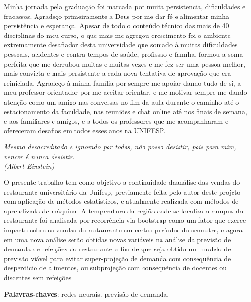 \documentclass[	12pt, Times, openright, twoside, a4paper, english, brazil]{abntex2}
\begin{document}
\begin{agradecimentos}
Minha jornada pela graduação foi marcada por muita persistencia, dificuldades e fracassos. Agradeço primeiramente a Deus por me dar fé e alimentar minha persistência e esperança. Apesar de todo o conteúdo técnico das mais de 40 disciplinas do meu curso, o que mais me agregou crescimento foi o ambiente extremamente desafiador desta universidade que somado à muitas dificuldades pessoais, acidentes e contra-tempos de saúde, profissão e família, formou a soma perfeita que me derrubou muitas e muitas vezes e me fez ser uma pessoa melhor, mais convicta e mais persistente a cada nova tentativa de aprovação que era reiniciada.  Agradeço à minha família por sempre me apoiar dando tudo de si, a meu professor orientador por me aceitar orientar, e me motivar sempre me dando atenção como um amigo nas conversas no fim da aula durante o caminho até o estacionamento da faculdade, nas reuniões e chat online até nos finais de semana, e aos familiares e amigos, e a todos os professores que me acompanharam e ofereceram desafios em todos esses anos na UNIFESP. 

\end{agradecimentos}

\begin{epigrafe}
    \vspace*{\fill}
	\begin{flushright}
		\textit{Mesmo desacreditado e ignorado por todos, não posso desistir, pois para mim, vencer é nunca desistir.\\
		(Albert Einstein)}
	\end{flushright}
\end{epigrafe}


\begin{resumo}
O presente trabalho tem como objetivo a continuidade daanálise das vendas do restaurante universitário da Unifesp, previamente feita pelo autor deste projeto com aplicação de métodos estatísticos, e atualmente realizada com métodos de aprendizado de máquina. A temperatura da região onde se localiza o campus do restaurante foi analisada por recorrência via bootstrap como um fator que exerce impacto sobre as vendas do restaurante em certos períodos do semestre, e agora em uma nova análise serão obtidas novas variáveis na análise da previsão de demanda de refeições do restaurante a fim de que seja obtido um modelo de previsão viável para evitar super-projeção de demanda com consequência de desperdício de alimentos, ou subprojeção com consequência de docentes ou discentes sem refeições.
 
 \vspace{\onelineskip}
    
 \noindent
 \textbf{Palavras-chaves}: redes neurais. previsão de demanda. 
\end{resumo}
\end{document}
